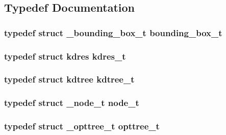 \subsection{\-Typedef \-Documentation}
\hypertarget{a00020_a8cc4dbdff0bcdec2142e75a68b717e6c_a8cc4dbdff0bcdec2142e75a68b717e6c}{
\subsubsection[{bounding\-\_\-box\-\_\-t}]{\setlength{\rightskip}{0pt plus 5cm}typedef struct {\bf \-\_\-bounding\-\_\-box\-\_\-t}  {\bf bounding\-\_\-box\-\_\-t}}}\label{db/db2/a00020_a8cc4dbdff0bcdec2142e75a68b717e6c_a8cc4dbdff0bcdec2142e75a68b717e6c}
\hypertarget{a00020_a7aa4cf85254d52d13693c7328834f6c5_a7aa4cf85254d52d13693c7328834f6c5}{
\subsubsection[{kdres\-\_\-t}]{\setlength{\rightskip}{0pt plus 5cm}typedef struct {\bf kdres} {\bf kdres\-\_\-t}}}\label{db/db2/a00020_a7aa4cf85254d52d13693c7328834f6c5_a7aa4cf85254d52d13693c7328834f6c5}
\hypertarget{a00020_a3f2e3c0cbfdc70b2db1a09b9aa637a63_a3f2e3c0cbfdc70b2db1a09b9aa637a63}{
\subsubsection[{kdtree\-\_\-t}]{\setlength{\rightskip}{0pt plus 5cm}typedef struct {\bf kdtree} {\bf kdtree\-\_\-t}}}\label{db/db2/a00020_a3f2e3c0cbfdc70b2db1a09b9aa637a63_a3f2e3c0cbfdc70b2db1a09b9aa637a63}
\hypertarget{a00020_a9c3f304c1ae0687240efd69b7dc98cd6_a9c3f304c1ae0687240efd69b7dc98cd6}{
\subsubsection[{node\-\_\-t}]{\setlength{\rightskip}{0pt plus 5cm}typedef struct {\bf \-\_\-node\-\_\-t} {\bf node\-\_\-t}}}\label{db/db2/a00020_a9c3f304c1ae0687240efd69b7dc98cd6_a9c3f304c1ae0687240efd69b7dc98cd6}
\hypertarget{a00020_a07b75293fafb6f31b7e9f723848ad105_a07b75293fafb6f31b7e9f723848ad105}{
\subsubsection[{opttree\-\_\-t}]{\setlength{\rightskip}{0pt plus 5cm}typedef struct {\bf \-\_\-opttree\-\_\-t} {\bf opttree\-\_\-t}}}\label{db/db2/a00020_a07b75293fafb6f31b7e9f723848ad105_a07b75293fafb6f31b7e9f723848ad105}



